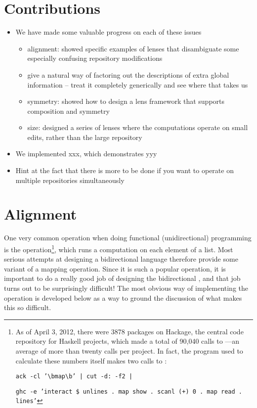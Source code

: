\section{Contributions}
\label{sec:contributions}
\begin{itemize}
    \item We have made some valuable progress on each of these issues
        \begin{itemize}
            \item alignment: showed specific examples of lenses that
                disambiguate some especially confusing repository
                modifications
            \item give a natural way of factoring out the descriptions of
                extra global information -- treat it completely generically
                and see where that takes us
            \item symmetry: showed how to design a lens framework that
                supports composition and symmetry
            \item size: designed a series of lenses where the computations
                operate on small edits, rather than the large repository
        \end{itemize}
    \item We implemented xxx, which demonstrates yyy
    \item Hint at the fact that there is more to be done if you want to
        operate on multiple repositories simultaneously
\end{itemize}
\section{Alignment}
One very common operation when doing functional (unidirectional) programming
is the \map operation\footnote{As of April 3, 2012, there were 3878 packages
on Hackage, the central code repository for Haskell projects, which made a
total of 90,040 calls to \map---an average of more than twenty calls per
project. In fact, the program used to calculate these numbers itself makes
two calls to \map:

\noindent\texttt{ack -cl '\textbackslash bmap\textbackslash b' | cut -d: -f2 |}

\noindent\texttt{ghc -e 'interact \$ unlines . map show . scanl (+) 0 . map read . lines'}
}, which runs a computation on each element of a list. Most serious attempts
at designing a bidirectional language therefore provide some variant of a
mapping operation. Since it is such a popular operation, it is important to
do a really good job of designing the bidirectional \map, and that job turns
out to be surprisingly difficult! The most obvious way of implementing the
\map operation is developed below as a way to ground the discussion of what
makes this so difficult.

